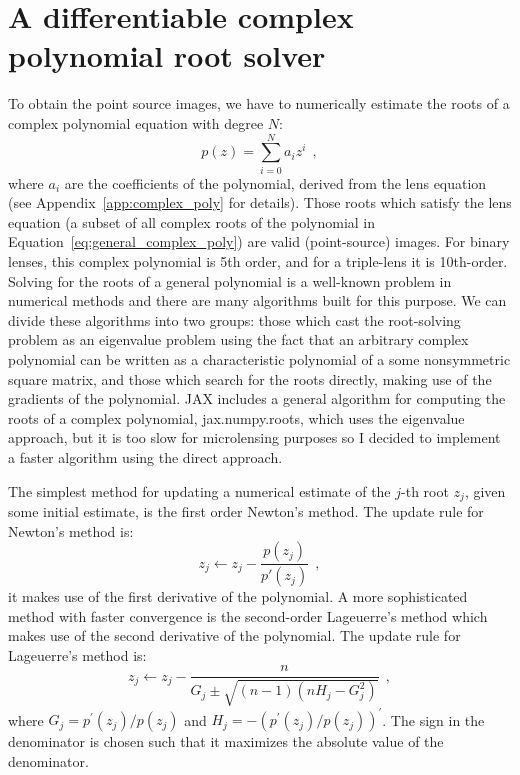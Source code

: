 \documentclass[12pt,dvipsnames]{report}
\newcommand{\ssf}[1]{\textsf{#1}}
\newcommand{\hquad}{~~}
\begin{document}
\section{A differentiable complex polynomial root solver}
\label{sec:caustics_root_solver}
To obtain the point
source images, we have to numerically estimate the roots of a complex polynomial 
equation with degree $N$:
\begin{equation}
    p(z)=\sum_{i=0}^{N} a_i z^i
    \hquad,
    \label{eq:general_complex_poly}
\end{equation}
where $a_i$ are the coefficients of the polynomial, derived from the lens equation
(see Appendix~\ref{app:complex_poly} for details). Those roots which satisfy the lens 
equation (a subset of all complex roots of the polynomial in 
Equation~\ref{eq:general_complex_poly}) are valid (point-source) images.
For binary lenses, this complex polynomial is 5th order, and for a triple-lens it is 
10th-order. Solving for the roots of a general polynomial is a well-known problem in numerical methods 
and there are many algorithms built for this purpose.
We can divide these algorithms into two groups:
those which cast the root-solving problem as an eigenvalue problem using the fact that 
an arbitrary complex polynomial can be written as a characteristic polynomial of a 
 some nonsymmetric square matrix, and those which search for the roots directly, making 
use of the gradients of the polynomial. \ssf{JAX} includes a general algorithm for computing
the roots of a complex polynomial, \ssf{jax.numpy.roots}, which uses the eigenvalue 
approach, but it is too slow for microlensing purposes so I decided to implement a faster
algorithm using the direct approach.

The simplest method for updating a numerical estimate  of the $j$-th root $z_j$, given 
some initial estimate, is the first order Newton's method. The update rule for 
Newton's method is:
\begin{equation}
    z_j \leftarrow z_j - \frac{p(z_j)}{p'(z_j)}
    \hquad,
\end{equation}
it makes use of the first derivative of the polynomial.
A more sophisticated method with faster convergence is the second-order Lageuerre's method
which makes use of the second derivative of the polynomial. The update rule for
Lageuerre's method is:
\begin{equation}
    z_j\leftarrow z_j - \frac{n}{G_{j} \pm \sqrt{(n-1)\left(n H_{j}-G_{j}^{2}\right)}}
    \hquad ,
    \label{eq:laguerre_update}
\end{equation}
where $G_j=p^\prime (z_j)/p(z_j)$  and $H_j=-(p^\prime (z_j)/p(z_j))^\prime$. 
The sign
in the denominator is chosen such that it maximizes the absolute value of the denominator.
\end{document}
